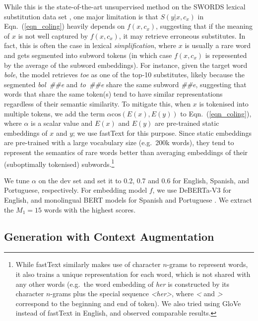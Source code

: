 \documentclass[11pt]{article}
\newcommand{\eqnref}[2][]{Eqn#1.~(\ref{#2})\xspace}
\newcommand{\ex}[1]{\textit{#1}\xspace}
\begin{document}
While this is the state-of-the-art unsupervised method on the SWORDS lexical substitution data set \cite{swords}, one major limitation is that ${S}(y|x,c_x)$ in \eqnref[]{eqn_coling} heavily depends on $f(x, c_x)$, suggesting that if the meaning of $x$ is not well captured by $f(x, c_x)$, it may retrieve erroneous substitutes. In fact, this is often the case in lexical {\it simplification}, where $x$ is usually a rare word and gets segmented into subword tokens (in which case $f(x, c_x)$ is represented by the average of the subword embeddings). For instance, given the target word \ex{bole}, the model retrieves \ex{toe}  as one of the top-10 substitutes, likely because the segmented \ex{bol~{\#\#e}} and \ex{to~{\#\#e}} share the same subword \ex{{\#\#e}}, suggesting that words that share the same token(s) tend to have similar representations regardless of their semantic similarity. To mitigate this, when $x$ is tokenised into multiple tokens, we
add the term {$\alpha \mathrm{cos}(E(x),E(y))$} to \eqnref[]{eqn_coling}, where $\alpha$ is a scalar value and $E(x)$ and $E(y)$ are pre-trained static embeddings of $x$ and $y$; we use fastText \cite{fasttext} for this purpose. Since static embeddings are pre-trained with a large vocabulary size (e.g.\ 200k words), they tend to represent the semantics of rare words better than averaging embeddings of their (suboptimally tokenised) subwords.\footnote{While fastText similarly makes use of character $n$-grams to represent words, it also trains a unique representation for each word, which is not shared with any other words (e.g.\ the word embedding of \ex{her} is constructed by its character $n$-grams plus the special sequence \ex{<her>}, where \ex{<} and \ex{>} correspond to the beginning and end of token). We also tried using GloVe \cite{glove} instead of fastText in English, and observed comparable results.}

We tune $\alpha$ on the dev set and set it to 0.2, 0.7 and 0.6 for English, Spanish, and Portuguese, respectively.  For embedding model $f$, we use DeBERTa-V3 \cite{deberta-v3} for English, and monolingual BERT models for Spanish and Portuguese  \cite{CaneteCFP2020,souza2020bertimbau}. We extract the $M_1=15$ words with the highest scores.

\subsection{Generation with Context Augmentation} \label{generation_sample}
\end{document}
